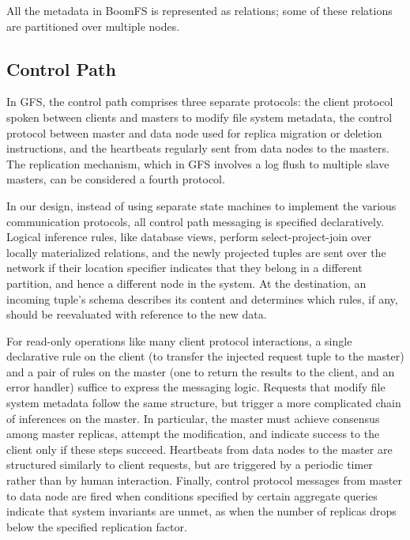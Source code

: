 \documentclass[twocolumn]{article}
\begin{document}
All the metadata in BoomFS is represented as relations; some of these
relations are partitioned over multiple nodes.

\subsection{Control Path}
\label{control-path}
In GFS, the control path comprises three separate protocols: the
client protocol spoken between clients and masters to modify
file system metadata, the control protocol between master and data node
used for replica migration or deletion instructions, and the
heartbeats regularly sent from data nodes to the masters.  The
replication mechanism, which in GFS involves a log flush to multiple
slave masters, can be considered a fourth protocol.

In our design, instead of using separate state machines to implement
the various communication protocols, all control path messaging is
specified declaratively.  Logical inference rules, like database
views, perform select-project-join over locally materialized
relations, and the newly projected tuples are sent over the network if
their location specifier indicates that they belong in a different
partition, and hence a different node in the system.  At the
destination, an incoming tuple's schema describes its content and
determines which rules, if any, should be reevaluated with reference
to the new data.

For read-only operations like many client protocol interactions, a
single declarative rule on the client (to transfer the injected
request tuple to the master) and a pair of rules on the master (one to
return the results to the client, and an error handler) suffice to
express the messaging logic.  Requests that modify file system
metadata follow the same structure, but trigger a more complicated
chain of inferences on the master.  In particular, the master must
achieve consensus among master replicas, attempt the modification, and
indicate success to the client only if these steps succeed.
Heartbeats from data nodes to the master are structured similarly to
client requests, but are triggered by a periodic timer rather than by
human interaction.  Finally, control protocol messages from master to
data node are fired when conditions specified by certain aggregate
queries indicate that system invariants are unmet, as when the number
of replicas drops below the specified replication factor.
\end{document}
